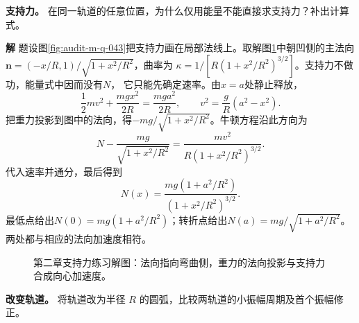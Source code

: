 \documentclass[11pt,openany,fontset=fandol]{ctexbook}
\theoremstyle{plain}\newtheorem{theorem}{定理}[chapter]\newtheorem{proposition}[theorem]{命题}
\theoremstyle{definition}\newtheorem{definition}{定义}[chapter]\newtheorem{example}{例}[chapter]
\theoremstyle{remark}\newtheorem*{remark}{说明}
\newcommand{\SolutionStart}{\par\nobreak\medskip\nobreak\noindent\textbf{解}\quad\ignorespaces}
\newenvironment{solution}{\SolutionStart}{\par\medskip}
\newcommand{\vct}[1]{\bm{#1}}\newcommand{\Rea}{\operatorname{Re}}\newcommand{\Ima}{\operatorname{Im}}
\begin{document}
\textbf{支持力。} 在同一轨道的任意位置，为什么仅用能量不能直接求支持力？补出计算式。


\begin{solution}
题设图\ref{fig:audit-m-q-043}把支持力画在局部法线上。取解图\ref{fig:class-2-2}中朝凹侧的主法向
$\vct n=(-x/R,1)/\sqrt{1+x^2/R^2}$，曲率为
$\kappa=1/[R(1+x^2/R^2)^{3/2}]$。支持力不做功，能量式中因而没有$N$，
它只能先确定速率。由$x=a$处静止释放，
\[
 \frac12mv^2+\frac{mgx^2}{2R}=\frac{mga^2}{2R},
 \qquad v^2=\frac gR(a^2-x^2).
\]
把重力投影到图中的法向，得$-mg/\sqrt{1+x^2/R^2}$。牛顿方程沿此方向为
\[
 N-\frac{mg}{\sqrt{1+x^2/R^2}}
 =\frac{mv^2}{R(1+x^2/R^2)^{3/2}}.
\]
代入速率并通分，最后得到
\[
 \boxed{N(x)=\frac{mg(1+a^2/R^2)}{(1+x^2/R^2)^{3/2}}}.
\]
最低点给出$N(0)=mg(1+a^2/R^2)$；转折点给出$N(a)=mg/\sqrt{1+a^2/R^2}$。
两处都与相应的法向加速度相符。

\begin{figure}[H]\centering
{}
\caption{第二章支持力练习解图：法向指向弯曲侧，重力的法向投影与支持力合成向心加速度。}
\label{fig:class-2-2}
\end{figure}
\end{solution}

\textbf{改变轨道。} 将轨道改为半径 $R$ 的圆弧，比较两轨道的小振幅周期及首个振幅修正。
\end{document}
